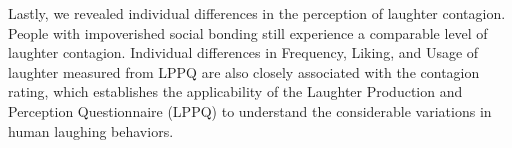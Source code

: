 Lastly, we revealed individual differences in the perception of laughter contagion. People with impoverished social bonding still experience a comparable level of laughter contagion. Individual differences in Frequency, Liking, and Usage of laughter measured from LPPQ are also closely associated with the contagion rating, which establishes the applicability of the Laughter Production and Perception Questionnaire (LPPQ) to understand the considerable variations in human laughing behaviors.